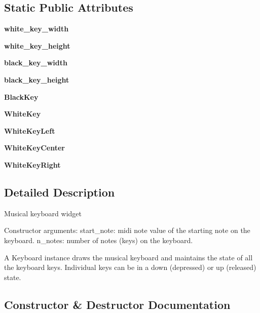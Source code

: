 \subsection*{Static Public Attributes}
\begin{DoxyCompactItemize}
\item 
\mbox{\label{classpygame_1_1examples_1_1midi_1_1_keyboard_ae0b4871d1e7134f0211de01dcaec4944}} 
{\bfseries white\+\_\+key\+\_\+width}
\item 
\mbox{\label{classpygame_1_1examples_1_1midi_1_1_keyboard_ab63cb1377c2ffb7d9cc304b956088b38}} 
{\bfseries white\+\_\+key\+\_\+height}
\item 
\mbox{\label{classpygame_1_1examples_1_1midi_1_1_keyboard_ad8d3d78ce15a24b9ea83f714be76b83d}} 
{\bfseries black\+\_\+key\+\_\+width}
\item 
\mbox{\label{classpygame_1_1examples_1_1midi_1_1_keyboard_abab89edcb694bbd15914aa05849eb034}} 
{\bfseries black\+\_\+key\+\_\+height}
\item 
{\bfseries Black\+Key}
\item 
{\bfseries White\+Key}
\item 
{\bfseries White\+Key\+Left}
\item 
{\bfseries White\+Key\+Center}
\item 
{\bfseries White\+Key\+Right}
\end{DoxyCompactItemize}


\subsection{Detailed Description}
\begin{DoxyVerb}Musical keyboard widget

Constructor arguments:
start_note: midi note value of the starting note on the keyboard.
n_notes: number of notes (keys) on the keyboard.

A Keyboard instance draws the musical keyboard and maintains the state of
all the keyboard keys. Individual keys can be in a down (depressed) or
up (released) state.\end{DoxyVerb}
 

\subsection{Constructor \& Destructor Documentation}
\mbox{\label{classpygame_1_1examples_1_1midi_1_1_keyboard_affb74278a62353871f8ff7d152883c77}} 
